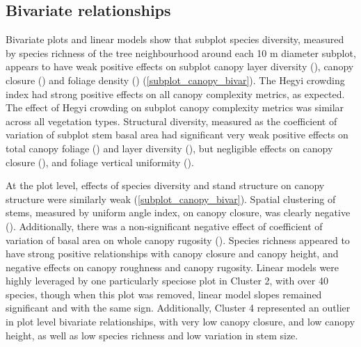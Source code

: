\documentclass[11pt,a4paper]{article}
\begin{document}
\subsection{Bivariate relationships}

Bivariate plots and linear models show that subplot species diversity, measured by species richness of the tree neighbourhood around each 10 m diameter subplot, appears to have weak positive effects on subplot canopy layer diversity (\richLayerDiv{}), canopy closure (\richCover{}) and foliage density (\richFoliage{}) (\autoref{subplot_canopy_bivar}). The Hegyi crowding index had strong positive effects on all canopy complexity metrics, as expected. The effect of Hegyi crowding on subplot canopy complexity metrics was similar across all vegetation types. Structural diversity, measured as the coefficient of variation of subplot stem basal area had significant very weak positive effects on total canopy foliage (\baCovFoliage{}) and layer diversity (\baCovLayerDiv{}), but negligible effects on canopy closure (\baCovCover), and foliage vertical uniformity (\baCovUnif{}). 

At the plot level, effects of species diversity and stand structure on canopy structure were similarly weak (\autoref{subplot_canopy_bivar}). Spatial clustering of stems, measured by uniform angle index, on canopy closure, was clearly negative (\winkelCoverP{}). Additionally, there was a non-significant negative effect of coefficient of variation of basal area on whole canopy rugosity (\baCovRugosityP{}). Species richness appeared to have strong positive relationships with canopy closure and canopy height, and negative effects on canopy roughness and canopy rugosity. Linear models were highly leveraged by one particularly speciose plot in Cluster 2, with over 40 species, though when this plot was removed, linear model slopes remained significant and with the same sign. Additionally, Cluster 4 represented an outlier in plot level bivariate relationships, with very low canopy closure, and low canopy height, as well as low species richness and low variation in stem size.
\end{document}
